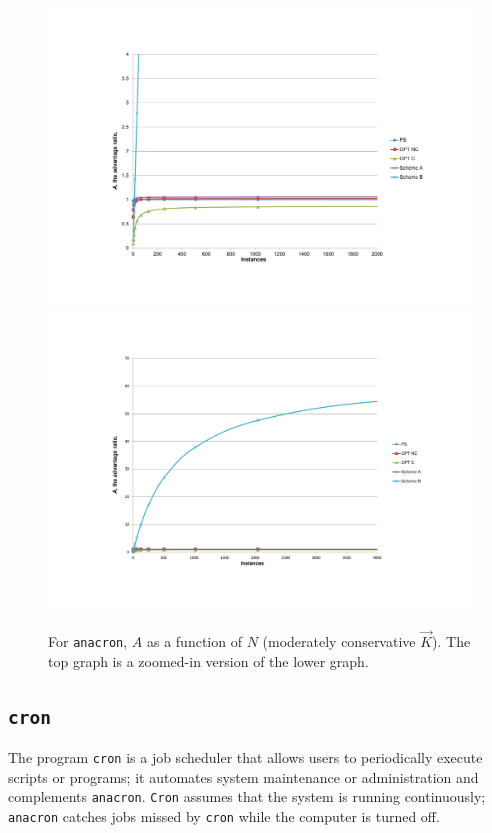 \begin{figure}
  \centering
  \subfloat%
           {\includegraphics[scale=0.75, trim=5cm 3cm 0cm 4.5cm]{anacron-2.pdf} \label{anacron2}} \\
  \subfloat%
           {\includegraphics[scale=0.75, trim=5cm 3cm 0cm 3cm]{anacron-3.pdf} \label{anacron3}} 
  \caption[For \texttt{anacron}, $A$ as a function of $N$ (moderately conservative $\vec K$)]%
          {For \texttt{anacron}, $A$ as a function of $N$ (moderately conservative $\vec K$).
          The top graph is a zoomed-in version of the lower graph.}
  \label{anacron23}
\end{figure}


\subsection{\texttt{cron}}
The program {\texttt{cron}} is a job scheduler
that allows users to periodically execute scripts or programs;
it automates system maintenance or administration
and complements \texttt{anacron}. \texttt{Cron}
assumes that the system is running continuously; 
\texttt{anacron} catches jobs missed
by \texttt{cron} while the computer is turned off.

